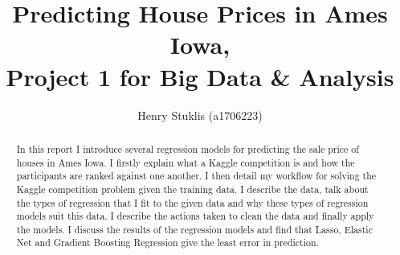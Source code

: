 \documentclass[a4paper]{article}
\begin{document}
\title{Predicting House Prices in Ames Iowa, \\ Project 1 for Big Data \& Analysis}
\author{Henry Stuklis (a1706223)}
\maketitle

\begin{abstract}
    In this report I introduce several regression models for predicting the sale price of houses in Ames Iowa. I firstly explain what a Kaggle competition is and how the participants are ranked against one another. I then detail my workflow for solving the Kaggle competition problem given the training data. I describe the data, talk about the types of regression that I fit to the given data and why these types of regression models suit this data. I describe the actions taken to clean the data and finally apply the models. I discuss the results of the regression models and find that Lasso, Elastic Net and Gradient Boosting Regression give the least error in prediction. 
\end{abstract}
\end{document}

